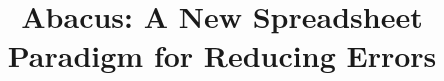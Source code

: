 \documentclass{acm_proc_article-sp}
\begin{document}
\title{Abacus: A New Spreadsheet Paradigm for Reducing Errors}

%
%
%
%
%
\end{document}

